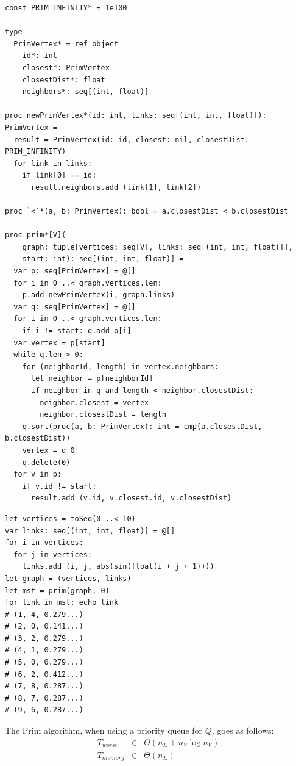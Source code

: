 \documentclass[justified, sixbynine]{tufte-book}
\def\ft{\small\tt}
\theoremstyle{plain}%
\newtheorem * {corollary}{Corollary}
\theoremstyle{definition}
\theoremstyle{remark}
\newtheorem * {remark}{Remark}
\newtheorem * {note}{Note}
\begin{document}
\begin{fullwidth}
\begin{lstlisting}[caption={in file: {\ft nlib/graph.nim}}]
const PRIM_INFINITY* = 1e100

type
  PrimVertex* = ref object
    id*: int
    closest*: PrimVertex
    closestDist*: float
    neighbors*: seq[(int, float)]

proc newPrimVertex*(id: int, links: seq[(int, int, float)]): PrimVertex =
  result = PrimVertex(id: id, closest: nil, closestDist: PRIM_INFINITY)
  for link in links:
    if link[0] == id:
      result.neighbors.add (link[1], link[2])

proc `<`*(a, b: PrimVertex): bool = a.closestDist < b.closestDist

proc prim*[V](
    graph: tuple[vertices: seq[V], links: seq[(int, int, float)]],
    start: int): seq[(int, int, float)] =
  var p: seq[PrimVertex] = @[]
  for i in 0 ..< graph.vertices.len:
    p.add newPrimVertex(i, graph.links)
  var q: seq[PrimVertex] = @[]
  for i in 0 ..< graph.vertices.len:
    if i != start: q.add p[i]
  var vertex = p[start]
  while q.len > 0:
    for (neighborId, length) in vertex.neighbors:
      let neighbor = p[neighborId]
      if neighbor in q and length < neighbor.closestDist:
        neighbor.closest = vertex
        neighbor.closestDist = length
    q.sort(proc(a, b: PrimVertex): int = cmp(a.closestDist, b.closestDist))
    vertex = q[0]
    q.delete(0)
  for v in p:
    if v.id != start:
      result.add (v.id, v.closest.id, v.closestDist)
\end{lstlisting}

\begin{lstlisting}
let vertices = toSeq(0 ..< 10)
var links: seq[(int, int, float)] = @[]
for i in vertices:
  for j in vertices:
    links.add (i, j, abs(sin(float(i + j + 1))))
let graph = (vertices, links)
let mst = prim(graph, 0)
for link in mst: echo link
# (1, 4, 0.279...)
# (2, 0, 0.141...)
# (3, 2, 0.279...)
# (4, 1, 0.279...)
# (5, 0, 0.279...)
# (6, 2, 0.412...)
# (7, 8, 0.287...)
# (8, 7, 0.287...)
# (9, 6, 0.287...)
\end{lstlisting}

The Prim algorithm, when using a priority queue for $Q$, goes as follows:
\begin{eqnarray}
T_{worst} &\in &\Theta (n_E+n_V\log n_V) \\
T_{memory} &\in &\Theta (n_E)
\end{eqnarray}


\end{fullwidth}
\end{document}
